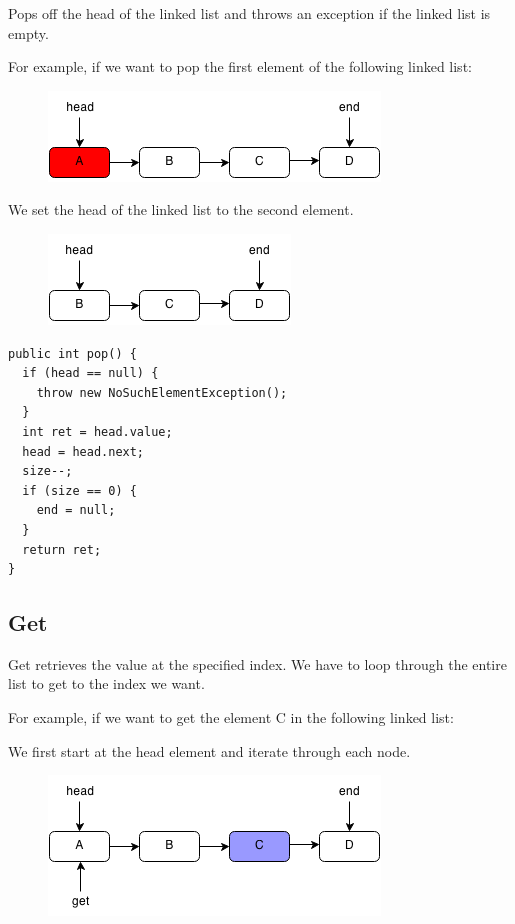 \documentclass[11pt,oneside]{book}
\makeatletter
\def\maxwidth#1{\ifdim\Gin@nat@width>#1 #1\else\Gin@nat@width\fi}
\makeatother
\begin{document}
Pops off the head of the linked list and throws an exception if the linked list is empty.

For example, if we want to pop the first element of the following linked list:

\vspace{5px}\begin{figure}[H]\centering
        \includegraphics[width=0.66\maxwidth{\textwidth}]{linkedlistpop.png}
        \end{figure}

We set the head of the linked list to the second element.

\vspace{5px}\begin{figure}[H]\centering
        \includegraphics[width=0.66\maxwidth{\textwidth}]{linkedlistpop2.png}
        \end{figure}

\begin{lstlisting}
public int pop() {
  if (head == null) {
    throw new NoSuchElementException();
  }
  int ret = head.value;
  head = head.next;
  size--;
  if (size == 0) {
    end = null;
  }
  return ret;
}
\end{lstlisting}

\subsection{Get}

Get retrieves the value at the specified index. We have to loop through the entire list to get to the index we want.

For example, if we want to get the element C in the following linked list:

We first start at the head element and iterate through each node.

\vspace{5px}\begin{figure}[H]\centering
        \includegraphics[width=0.66\maxwidth{\textwidth}]{linkedlistget.png}
        \end{figure}
\end{document}
